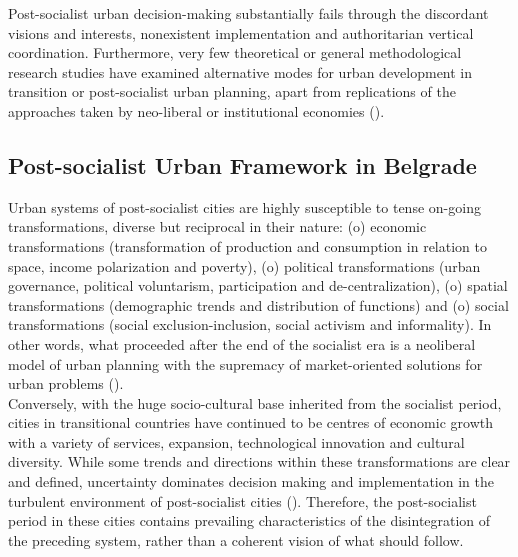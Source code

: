 \documentclass[11pt]{report}
\begin{document}
{{{{Post-socialist urban decision-making substantially fails through the discordant visions and interests, nonexistent implementation and authoritarian vertical coordination. Furthermore, very few theoretical or general methodological research studies have examined alternative modes for urban development in transition or post-socialist urban planning, apart from replications of the approaches taken by neo-liberal or institutional economies (\href{Tsenkova}{\citealt{tsenkova_urban_2007}}).

\subsection{Post-socialist Urban Framework in Belgrade}

Urban systems of post-socialist cities are highly susceptible to tense on-going transformations, diverse but reciprocal in their nature:
(o) economic transformations (transformation of production and consumption in relation to space, income polarization and poverty),
(o) political transformations (urban governance, political voluntarism, participation and de-centralization),
(o) spatial transformations (demographic trends and distribution of functions) and
(o) social transformations (social exclusion-inclusion, social activism and informality). In other words, what proceeded after the end of the socialist era is a neoliberal model of urban planning with the supremacy of market-oriented solutions for urban problems (\href{ref}{\citealt{sager_neo-liberal_2011}}).
\\

Conversely, with the huge socio-cultural base inherited from the socialist period, cities in transitional countries have continued to be centres of economic growth with a variety of services, expansion, technological innovation and cultural diversity. While some trends and directions within these transformations are clear and defined, uncertainty dominates decision making and implementation in the turbulent environment of post-socialist cities (\href{ref}{\citealt{nedovic-budic_mornings_2011}}). Therefore, the post-socialist period in these cities contains prevailing characteristics of the disintegration of the preceding system, rather than a coherent vision of what should follow.
\\

}}}}
\end{document}
